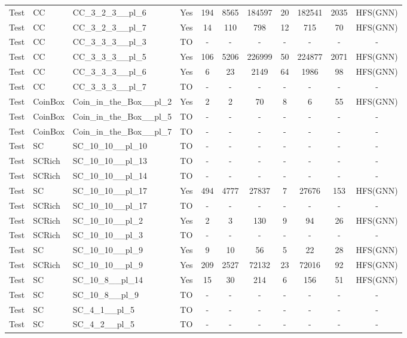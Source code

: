 \documentclass{article}
\begin{document}
\begin{tabular}{lllcccccccc}
Test & CC & CC\_3\_2\_3\_\_pl\_6 & Yes & 194 & 8565 & 184597 & 20 & 182541 & 2035 & HFS(GNN) \\
Test & CC & CC\_3\_2\_3\_\_pl\_7 & Yes & 14 & 110 & 798 & 12 & 715 & 70 & HFS(GNN) \\
Test & CC & CC\_3\_3\_3\_\_pl\_3 & TO & - & - & - & - & - & - & - \\
Test & CC & CC\_3\_3\_3\_\_pl\_5 & Yes & 106 & 5206 & 226999 & 50 & 224877 & 2071 & HFS(GNN) \\
Test & CC & CC\_3\_3\_3\_\_pl\_6 & Yes & 6 & 23 & 2149 & 64 & 1986 & 98 & HFS(GNN) \\
Test & CC & CC\_3\_3\_3\_\_pl\_7 & TO & - & - & - & - & - & - & - \\
Test & CoinBox & Coin\_in\_the\_Box\_\_pl\_2 & Yes & 2 & 2 & 70 & 8 & 6 & 55 & HFS(GNN) \\
Test & CoinBox & Coin\_in\_the\_Box\_\_pl\_5 & TO & - & - & - & - & - & - & - \\
Test & CoinBox & Coin\_in\_the\_Box\_\_pl\_7 & TO & - & - & - & - & - & - & - \\
Test & SC & SC\_10\_10\_\_pl\_10 & TO & - & - & - & - & - & - & - \\
Test & SCRich & SC\_10\_10\_\_pl\_13 & TO & - & - & - & - & - & - & - \\
Test & SCRich & SC\_10\_10\_\_pl\_14 & TO & - & - & - & - & - & - & - \\
Test & SC & SC\_10\_10\_\_pl\_17 & Yes & 494 & 4777 & 27837 & 7 & 27676 & 153 & HFS(GNN) \\
Test & SCRich & SC\_10\_10\_\_pl\_17 & TO & - & - & - & - & - & - & - \\
Test & SCRich & SC\_10\_10\_\_pl\_2 & Yes & 2 & 3 & 130 & 9 & 94 & 26 & HFS(GNN) \\
Test & SCRich & SC\_10\_10\_\_pl\_3 & TO & - & - & - & - & - & - & - \\
Test & SC & SC\_10\_10\_\_pl\_9 & Yes & 9 & 10 & 56 & 5 & 22 & 28 & HFS(GNN) \\
Test & SCRich & SC\_10\_10\_\_pl\_9 & Yes & 209 & 2527 & 72132 & 23 & 72016 & 92 & HFS(GNN) \\
Test & SC & SC\_10\_8\_\_pl\_14 & Yes & 15 & 30 & 214 & 6 & 156 & 51 & HFS(GNN) \\
Test & SC & SC\_10\_8\_\_pl\_9 & TO & - & - & - & - & - & - & - \\
Test & SC & SC\_4\_1\_\_pl\_5 & TO & - & - & - & - & - & - & - \\
Test & SC & SC\_4\_2\_\_pl\_5 & TO & - & - & - & - & - & - & - \\

\end{tabular}
\end{document}
